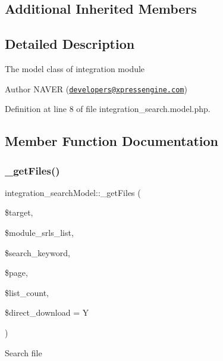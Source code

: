 \subsection*{Additional Inherited Members}


\subsection{Detailed Description}
The model class of integration module

\begin{DoxyAuthor}{Author}
N\+A\+V\+ER (\href{mailto:developers@xpressengine.com}{\tt developers@xpressengine.\+com}) 
\end{DoxyAuthor}


Definition at line 8 of file integration\+\_\+search.\+model.\+php.



\subsection{Member Function Documentation}
\hypertarget{classintegration__searchModel_a88561e8ec8d5c401cee5220a0297d6e9}{}\label{classintegration__searchModel_a88561e8ec8d5c401cee5220a0297d6e9} 
\subsubsection{\texorpdfstring{\+\_\+get\+Files()}{\_getFiles()}}
{\footnotesize\ttfamily integration\+\_\+search\+Model\+::\+\_\+get\+Files (\begin{DoxyParamCaption}\item[{}]{\$target,  }\item[{}]{\$module\+\_\+srls\+\_\+list,  }\item[{}]{\$search\+\_\+keyword,  }\item[{}]{\$page,  }\item[{}]{\$list\+\_\+count,  }\item[{}]{\$direct\+\_\+download = {\ttfamily \textquotesingle{}Y\textquotesingle{}} }\end{DoxyParamCaption})}

Search file


